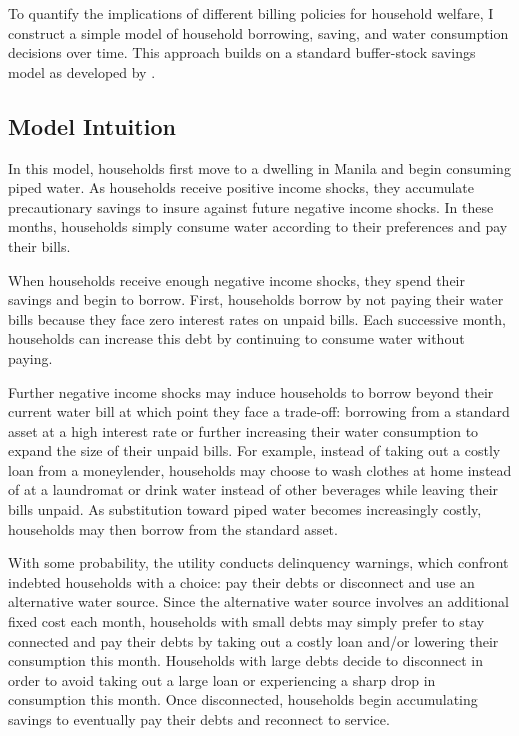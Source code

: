 \documentclass[12pt,table]{article}
\begin{document}

To quantify the implications of different billing policies for household welfare, I construct a simple model of household borrowing, saving, and water consumption decisions over time.  This approach builds on a standard buffer-stock savings model as developed by \cite{deaton1991saving}.

\subsection{Model Intuition}

In this model, households first move to a dwelling in Manila and begin consuming piped water.  As households receive positive income shocks, they accumulate precautionary savings to insure against future negative income shocks.  In these months, households simply consume water according to their preferences and pay their bills.

When households receive enough negative income shocks, they spend their savings and begin to borrow.  First, households borrow by not paying their water bills because they face zero interest rates on unpaid bills.  Each successive month, households can increase this debt by continuing to consume water without paying.

Further negative income shocks may induce households to borrow beyond their current water bill at which point they face a trade-off: borrowing from a standard asset at a high interest rate or further increasing their water consumption to expand the size of their unpaid bills.  For example, instead of taking out a costly loan from a moneylender, households may choose to wash clothes at home instead of at a laundromat or drink water instead of other beverages while leaving their bills unpaid.  As substitution toward piped water becomes increasingly costly, households may then borrow from the standard asset.

With some probability, the utility conducts delinquency warnings, which confront indebted households with a choice: pay their debts or disconnect and use an alternative water source.  Since the alternative water source involves an additional fixed cost each month, households with small debts may simply prefer to stay connected and pay their debts by taking out a costly loan and/or lowering their consumption this month.  Households with large debts decide to disconnect in order to avoid taking out a large loan or experiencing a sharp drop in consumption this month.  Once disconnected, households begin accumulating savings to eventually pay their debts and reconnect to service.
\end{document}

